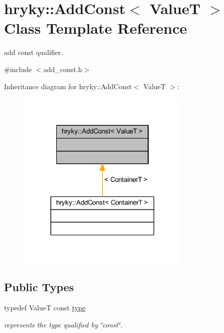 \hypertarget{classhryky_1_1_add_const}{\section{hryky\-:\-:Add\-Const$<$ Value\-T $>$ Class Template Reference}
\label{classhryky_1_1_add_const}
}


add const qualifier.  




{\ttfamily \#include $<$add\-\_\-const.\-h$>$}



Inheritance diagram for hryky\-:\-:Add\-Const$<$ Value\-T $>$\-:
\nopagebreak
\begin{figure}[H]
\begin{center}
\leavevmode
\includegraphics[width=234pt]{classhryky_1_1_add_const__inherit__graph}
\end{center}
\end{figure}
\subsection*{Public Types}
\begin{DoxyCompactItemize}
\item 
\hypertarget{classhryky_1_1_add_const_adb29046fcfdac9d716cb5cb3c28d42ac}{typedef Value\-T const \hyperlink{classhryky_1_1_add_const_adb29046fcfdac9d716cb5cb3c28d42ac}{type}}\label{classhryky_1_1_add_const_adb29046fcfdac9d716cb5cb3c28d42ac}

\begin{DoxyCompactList}\small\item\em represents the type qualified by \char`\"{}const\char`\"{}. \end{DoxyCompactList}\end{DoxyCompactItemize}


